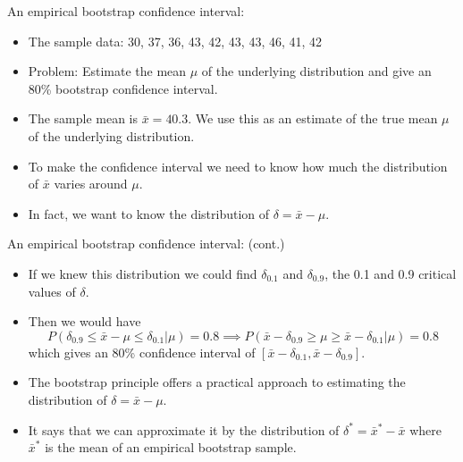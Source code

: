 \documentclass[
  ignorenonframetext,
]{beamer}
\providecommand{\tightlist}{%
  \setlength{\itemsep}{0pt}\setlength{\parskip}{0pt}}
\begin{document}
\begin{frame}{An empirical bootstrap confidence interval:}
\label{an-empirical-bootstrap-confidence-interval}
\begin{itemize}
\tightlist
\item
  The {sample data:} 30, 37, 36, 43, 42, 43, 43, 46, 41, 42
\item
  Problem: {Estimate the mean \(\mu\)} of the underlying distribution
  and give an {80\% bootstrap confidence interval.}
\item
  The sample mean is \(\bar{x} = 40.3\). We {use this as an estimate} of
  the true mean \(\mu\) of the underlying distribution.
\item
  To make the confidence interval we need to know how much the
  {distribution of \(\bar{x}\) varies around \(\mu\).}
\item
  In fact, we want to know the {distribution of
  \(\delta = \bar{x} - \mu\)}.
\end{itemize}
\end{frame}

\begin{frame}{An empirical bootstrap confidence interval: (cont.)}
\label{an-empirical-bootstrap-confidence-interval-cont.}
\begin{itemize}
\tightlist
\item
  If we {knew this distribution} we could find \(\delta_{0.1}\) and
  \(\delta_{0.9}\), the 0.1 and 0.9 critical values of \(\delta\).
\item
  Then we would have
  \[P(\delta_{0.9} \leq \bar{x} - \mu \leq \delta_{0.1} | \mu) = 0.8 \implies P(\bar{x} - \delta_{0.9} \geq \mu \geq \bar{x} - \delta_{0.1} | \mu ) = 0.8\]
  which gives {an 80\% confidence interval} of
  \([\bar{x} - \delta_{0.1}, \bar{x} - \delta_{0.9} ]\).
\item
  The bootstrap principle offers a {practical approach to estimating the
  distribution} of \(\delta = \bar{x} - \mu\).
\item
  It says that we can approximate it by the distribution of
  \(\delta^* = \bar{x}^* - \bar{x}\) where \(\bar{x}^*\) is the mean of
  an empirical bootstrap sample.
\end{itemize}
\end{frame}
\end{document}
